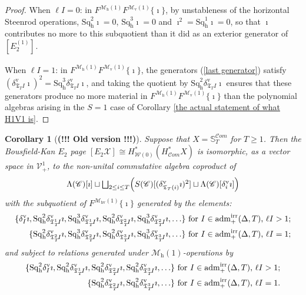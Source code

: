 \documentclass[11pt]{amsart} \renewcommand{\baselinestretch}{1.4}
\theoremstyle{plain}
\newtheorem{cor}[thm]{Corollary}
\theoremstyle{definition}
\newcommand{\scrC}{\mathscr{C}}
\newcommand{\calV}{\mathcal{V}}
\newcommand{\calw}{\mathcal{W}}
\newcommand{\calx}{\mathcal{X}}
\newcommand{\calMv}{\mathcal{M}\dver}
\newcommand{\calMh}{\mathcal{M}\dhor}
\newcommand{\calMhv}{\mathcal{M}_\mathrm{hv}}
\newcommand{\CommOperad}{{\scrC}}
\newcommand{\vect}[2]{\calV^{#1}_{#2}}
\newcommand{\aDTirr}{\mathrm{adm}_+^\mathrm{irr}(\Delta,T)}
\newcommand{\algs}{{\scrC\!\textit{om}}}
\newcommand{\TOP}{\mathfrak{T}}
\newcommand{\E}[5]{[E^{#1}_{#2}#3]^{#4}_{#5}}
\newcommand{\uver}{^\mathrm{v}}
\newcommand{\dver}{_\mathrm{v}}
\newcommand{\dhor}{_\mathrm{h}}
\newcommand{\Sqh}{\mathrm{Sq}\dhor}
\newcommand{\deltav}{\delta\uver}
\begin{document}
\begin{Calculations of HWn for n nonzero}
\begin{proof}
When $\ell I=0$: in $F^{\calMh(1)}F^{\calMv(1)}\{\imath\}$, by unstableness of the horizontal Steenrod operations, $\Sqh^2\imath=0$, $\Sqh^3\imath=0$ and $\imath^2=\Sqh^1\imath=0$, so that $\imath$ contributes no more to this subquotient than it did as an exterior generator of $\E{(1)}{2}{}{}{}$.

When  $\ell I=1$: in $F^{\calMh(1)}F^{\calMv(1)}\{\imath\}$, the generators (\ref{last generator}) satisfy
$(\deltav_{\TOP_T I}\imath)^{2}=\Sqh^3\deltav_{\TOP_T I}\imath$, and taking the quotient by $\Sqh^2\deltav_{\TOP_T I}\imath$ ensures that these generators produce no more material in $F^{\calMh(1)}F^{\calMv(1)}\{\imath\}$ than the polynomial algebras arising in the $S=1$ case of Corollary \ref{the actual statement of what H1V1 is}.
\end{proof}

\begin{cor}[\textbf{(!!! Old version !!!)}]
Suppose that $X=\mathbb{S}_{T}^{\algs}$ for $T\geq1$. Then the Bousfield-Kan $E_2$ page $\E{}{2}{\calx}{}{}\cong H^*_{\calw(0)}(H^*_\algs X)$ is isomorphic, as a vector space in $\vect{1}{+}$, to the non-unital commutative algebra coproduct of
\[\Lambda(\CommOperad)[\imath]\sqcup \textstyle\bigsqcup_{2\leq i\leq T} \Bigl(S(\CommOperad) [(\deltav_{\TOP_T(i)}\imath)^{2}]\sqcup \Lambda(\CommOperad)[\deltav_i\imath]\Bigr)\]
with the subquotient of $F^{\calMhv(1)}\{\imath\}$ generated by the elements:
\begin{alignat}{2}
\label{ell 2plus}
\{\deltav_{I}\imath,
\Sqh^2\deltav_{\TOP_T^1\!I}\imath,\Sqh^3\deltav_{\TOP_T^1\!I}\imath,
\Sqh^2\deltav_{\TOP_T^2\!I}\imath,\Sqh^3\deltav_{\TOP_T^2\!I}\imath,
\ldots\}\textup{ for $I\in\aDTirr$, $\ell I>1$;}
\\
\label{ell 1}
\{
\Sqh^2\deltav_{\TOP_T^2\!I}\imath,\Sqh^3\deltav_{\TOP_T^2\!I}\imath,
\Sqh^2\deltav_{\TOP_T^3\!I}\imath,\Sqh^3\deltav_{\TOP_T^3\!I}\imath,
\ldots\}\textup{ for $I\in\aDTirr$, $\ell I=1$;}
\end{alignat}
and subject to  relations generated under $\calMh(1)$-operations by
\begin{alignat}{2}
\label{ell 2plus}
\{
\Sqh^2\deltav_{I}\imath,
\Sqh^2\deltav_{\TOP_T^1\!I}\imath,
\Sqh^2\deltav_{\TOP_T^2\!I}\imath,
\Sqh^2\deltav_{\TOP_T^3\!I}\imath,
\ldots\}\textup{ for $I\in\aDTirr$, $\ell I>1$;}
\\
\label{ell 1}
\{
\Sqh^2\deltav_{\TOP_T^2\!I}\imath,
\Sqh^2\deltav_{\TOP_T^3\!I}\imath,
\ldots\}\textup{ for $I\in\aDTirr$, $\ell I=1$.}
\end{alignat}
\end{cor}




\end{Calculations of HWn for n nonzero}
\end{document}
